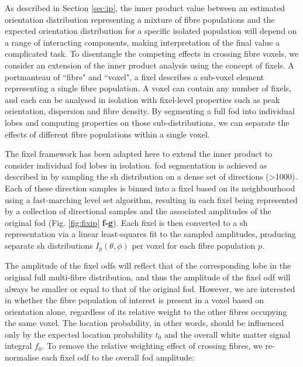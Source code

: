 As described in Section \ref{sec:ip}, the inner product value between an estimated orientation distribution representing a mixture of fibre populations and the expected orientation distribution for a specific isolated population will depend on a range of interacting components, making interpretation of the final value a complicated task.
To disentangle the competing effects in crossing fibre voxels, we consider an extension of the inner product analysis using the concept of fixels.
A portmanteau of ``fibre" and ``voxel", a fixel describes a sub-voxel element representing a single fibre population\autocite{Raffelt2015,Raffelt2017}.
A voxel can contain any number of fixels, and each can be analysed in isolation with fixel-level properties such as peak orientation, dispersion and fibre density.
By segmenting a full \gls{fod} into individual lobes and computing properties on those sub-distributions, we can separate the effects of different fibre populations within a single voxel.

The fixel framework has been adapted here to extend the inner product to consider individual \gls{fod} lobes in isolation.
\Gls{fod} segmentation is achieved as described in \textcite{Smith2013} by sampling the \gls{sh} distribution on a dense set of directions (\textgreater 1000).
Each of these direction samples is binned into a fixel based on its neighbourhood using a fast-marching level set algorithm, resulting in each fixel being represented by a collection of directional samples and the associated amplitudes of the original \gls{fod} (Fig. \ref{fig:fixip} \textbf{f-g}).
Each fixel is then converted to a \gls{sh} representation via a linear least-squares fit to the sampled amplitudes, producing separate \gls{sh} distributions $I_p(\theta, \phi)$ per voxel for each fibre population $p$.

The amplitude of the fixel \glspl{odf} will reflect that of the corresponding lobe in the original full multi-fibre distribution, and thus the amplitude of the fixel \gls{odf} will always be smaller or equal to that of the original \gls{fod}.
However, we are interested in whether the fibre population of interest is present in a voxel based on orientation alone, regardless of its relative weight to the other fibres occupying the same voxel.
The location probability, in other words, should be influenced only by the expected location probability $t_0$ and the overall white matter signal integral $f_0$.
To remove the relative weighting effect of crossing fibres, we re-normalise each fixel \gls{odf} to the overall \gls{fod} amplitude:

